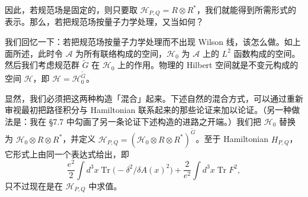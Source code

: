 因此，若规范场是固定的，则只要取 $\mathcal{H}_{P,Q}=R\otimes R^*$，我们就能得到所需形式的表示。那么，若把规范场按量子力学处理，又当如何？


我们回忆一下：若把规范场按量子力学处理而不出现 Wilson 线，该怎么做。如上面所述，此时令 $\mathcal{A}$ 为所有联络构成的空间，$\mathcal{H}_0$ 为 $\mathcal{A}$ 上的 $L^2$ 函数构成的空间。然后我们考虑规范群 $\widetilde{G}$ 在 $\mathcal{H}_0$ 上的作用。物理的 Hilbert 空间就是不变元构成的空间 $\mathcal{H}$，即 $\mathcal{H}=\mathcal{H}_0^{\widetilde{G}}$。

显然，我们必须把这两种构造「混合」起来。下述自然的混合方式，可以通过重新审视最初把路径积分与 Hamiltonian 联系起来的那些论证来加以论证。（另一种做法是：我在 §7.7 中勾画了另一条论证下述构造的进路之开端。）我们把 $\mathcal{H}_0$ 替换为 $\mathcal{H}_0\otimes R\otimes R^*$，并定义 $\mathcal{H}_{P,Q}=(\mathcal{H}_0\otimes R\otimes R^*)^{\widetilde{G}}$。至于 Hamiltonian $H_{P,Q}$，它形式上由同一个表达式给出，即
\[
\frac{e^2}{2}\int d^3x\operatorname{Tr}\bigl(-\delta^2/\delta A(x)^2\bigr)+\frac{2}{e^2}\int d^3x\operatorname{Tr}F^2 ,
\]
只不过现在是在 $\mathcal{H}_{P,Q}$ 中求值。


